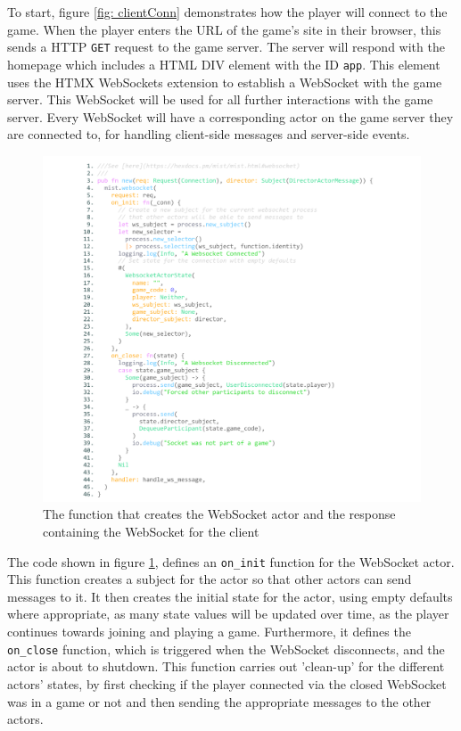 \documentclass[]{final}
\begin{document}
To start, figure \ref{fig: clientConn} demonstrates how the player will connect to the game.
When the player enters the URL of the game's site in their browser, this sends a HTTP
\lstinline|GET| request to the game server. The server will respond with the homepage which
includes a HTML DIV element with the ID \lstinline|app|. This element uses the HTMX WebSockets
extension to establish a WebSocket with the game server. This WebSocket will be
used for all further interactions with the game server. Every WebSocket will have a corresponding
actor on the game server they are connected to, for handling client-side messages and
server-side events.

\newpage

\begin{figure}[H]
  \centering
  \includegraphics[width=\textwidth]{mist_websocket.pdf}
  \caption{The function that creates the WebSocket actor and the response containing the WebSocket for the client}\label{fig: mistwebsocket}
\end{figure}

The code shown in figure \ref{fig: mistwebsocket}, defines an \lstinline|on_init| function for the WebSocket actor. This function
creates a subject for the actor so that other actors can send messages to it.
It then creates the initial state for the actor, using empty defaults where appropriate,
as many state values will be updated over time, as the player continues towards
joining and playing a game. Furthermore, it defines the \lstinline|on_close| function,
which is triggered when the WebSocket disconnects, and the actor is about to shutdown. This function carries out
'clean-up' for the different actors' states, by first checking if the player
connected via the closed WebSocket was in a game or not and then sending the
appropriate messages to the other actors.
\end{document}
